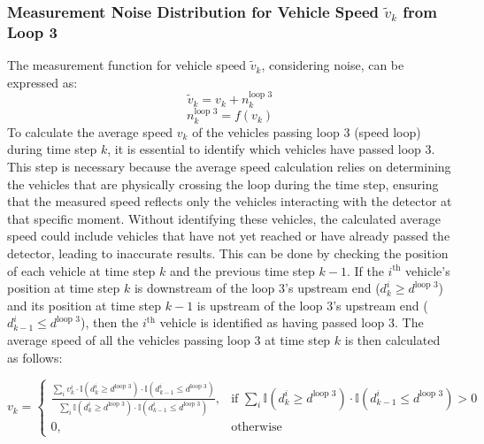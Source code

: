 \subsubsection{Measurement Noise Distribution for Vehicle Speed $\tilde v_k$ from Loop 3}

The measurement function for vehicle speed \( \tilde v_k \), considering noise, can be expressed as:
\begin{equation}
    \tilde v_k = v_k + n_k^\text{loop 3}
\end{equation}
\begin{equation}
    n_k^\text{loop 3} = f(v_k)
\end{equation}
To calculate the average speed \( v_k \) of the vehicles passing loop 3 (speed loop) during time step \( k \), it is essential to identify which vehicles have passed loop 3. This step is necessary because the average speed calculation relies on determining the vehicles that are physically crossing the loop during the time step, ensuring that the measured speed reflects only the vehicles interacting with the detector at that specific moment. Without identifying these vehicles, the calculated average speed could include vehicles that have not yet reached or have already passed the detector, leading to inaccurate results. This can be done by checking the position of each vehicle at time step \( k \) and the previous time step \( k-1 \). If the \( i^\text{th} \) vehicle's position at time step \( k \) is downstream of the loop 3's upstream end (\( d_{k}^i \geq d^{\text{loop 3}} \)) and its position at time step \( k-1 \) is upstream of the loop 3's upstream end (\( d_{k-1}^i \leq d^{\text{loop 3}} \)), then the \( i^\text{th} \) vehicle is identified as having passed loop 3. The average speed of all the vehicles passing loop 3 at time step \( k \) is then calculated as follows:



\begin{equation}\label{AverageSpeed}
v_k = 
\begin{cases}
\frac{\sum_{i} v_{k}^i \cdot \mathbb{I}(d_{k}^i \geq d^{\text{loop 3}}) \cdot \mathbb{I}(d_{k-1}^i \leq d^{\text{loop 3}})}{\sum_{i} \mathbb{I}(d_{k}^i \geq d^{\text{loop 3}}) \cdot \mathbb{I}(d_{k-1}^i \leq d^{\text{loop 3}})}, & \text{if } \sum_{i} \mathbb{I}(d_{k}^i \geq d^{\text{loop 3}}) \cdot \mathbb{I}(d_{k-1}^i \leq d^{\text{loop 3}}) > 0 \\
0, & \text{otherwise}
\end{cases}
\end{equation}

